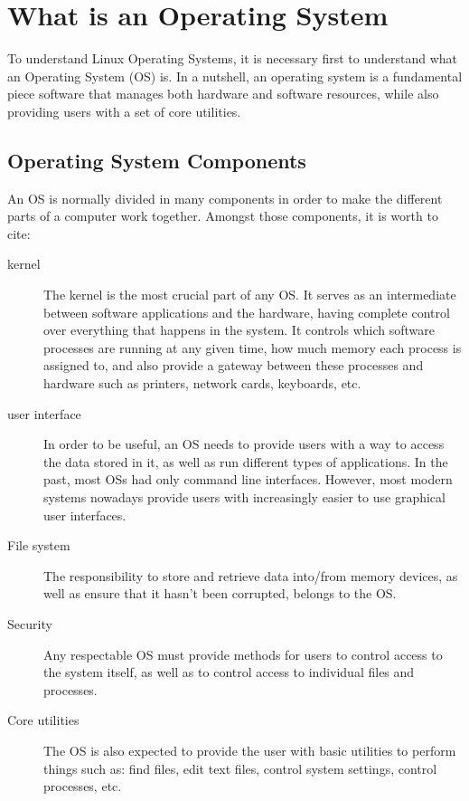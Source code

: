 \chapter{What is an Operating System}\label{ch:os}

To understand Linux Operating Systems, it is necessary first to understand what an Operating System (\acs{OS}) is. In a nutshell, an operating system is a fundamental piece software that manages both hardware and software resources, while also providing users with a set of core utilities.


\section{Operating System Components}

An \acs{OS} is normally divided in many components in order to make the different parts of a computer work together. Amongst those components, it is worth to cite:
\begin{description}
\item[kernel] The kernel is the most crucial part of any \acs{OS}. It serves as an intermediate between software applications and the hardware, having complete control over everything that happens in the system. It controls which software processes are running at any given time, how much memory each process is assigned to, and also provide a gateway between these processes and hardware such as printers, network cards, keyboards, etc.
\item[user interface] In order to be useful, an \acs{OS} needs to provide users with a way to access the data stored in it, as well as run different types of applications. In the past, most \acs{OS}s had only command line interfaces. However, most modern systems nowadays provide users with increasingly easier to use graphical user interfaces.
\item[File system] The responsibility to store and retrieve data into/from memory devices, as well as ensure that it hasn't been corrupted, belongs to the \acs{OS}.
\item[Security] Any respectable \acs{OS} must provide methods for users to control access to the system itself, as well as to control access to individual files and processes.
\item[Core utilities] The \acs{OS} is also expected to provide the user with basic utilities to perform things such as: find files, edit text files, control system settings, control processes, etc.
\end{description}

